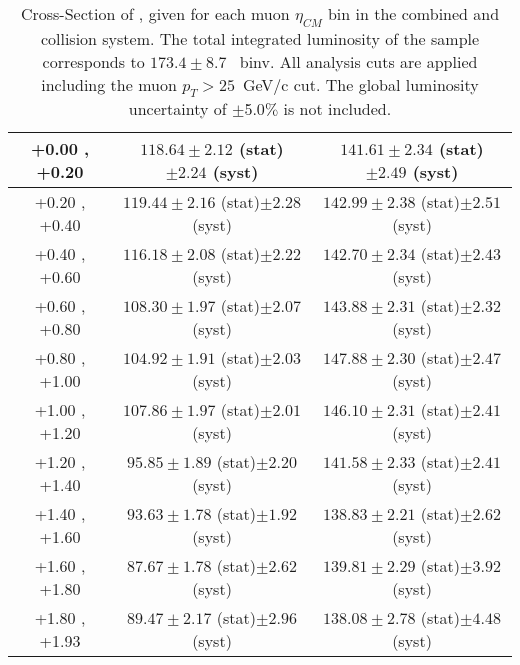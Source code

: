 \begin{table}[h!]
\begin{tabular}{|c|*2c|}
    +0.00 , +0.20 & $118.64 \pm 2.12$ (stat)$ \pm 2.24$ (syst) & $141.61 \pm 2.34$ (stat)$ \pm 2.49$ (syst)\\
    \hline
    +0.20 , +0.40 & $119.44 \pm 2.16$ (stat)$ \pm 2.28$ (syst) & $142.99 \pm 2.38$ (stat)$ \pm 2.51$ (syst)\\
    \hline
    +0.40 , +0.60 & $116.18 \pm 2.08$ (stat)$ \pm 2.22$ (syst) & $142.70 \pm 2.34$ (stat)$ \pm 2.43$ (syst)\\
    \hline
    +0.60 , +0.80 & $108.30 \pm 1.97$ (stat)$ \pm 2.07$ (syst) & $143.88 \pm 2.31$ (stat)$ \pm 2.32$ (syst)\\
    \hline
    +0.80 , +1.00 & $104.92 \pm 1.91$ (stat)$ \pm 2.03$ (syst) & $147.88 \pm 2.30$ (stat)$ \pm 2.47$ (syst)\\
    \hline
    +1.00 , +1.20 & $107.86 \pm 1.97$ (stat)$ \pm 2.01$ (syst) & $146.10 \pm 2.31$ (stat)$ \pm 2.41$ (syst)\\
    \hline
    +1.20 , +1.40 & $95.85 \pm 1.89$ (stat)$ \pm 2.20$ (syst) & $141.58 \pm 2.33$ (stat)$ \pm 2.41$ (syst)\\
    \hline
    +1.40 , +1.60 & $93.63 \pm 1.78$ (stat)$ \pm 1.92$ (syst) & $138.83 \pm 2.21$ (stat)$ \pm 2.62$ (syst)\\
    \hline
    +1.60 , +1.80 & $87.67 \pm 1.78$ (stat)$ \pm 2.62$ (syst) & $139.81 \pm 2.29$ (stat)$ \pm 3.92$ (syst)\\
    \hline
    +1.80 , +1.93 & $89.47 \pm 2.17$ (stat)$ \pm 2.96$ (syst) & $138.08 \pm 2.78$ (stat)$ \pm 4.48$ (syst)\\
    \hline
  \end{tabular}
  \caption{Cross-Section of \WToMuNu, given for each muon $\eta_{CM}$ bin in the combined \pPb and \Pbp collision system. The total integrated luminosity of the sample corresponds to $173.4 \pm 8.7$~
binv. All analysis cuts are applied including the muon $p_{T} > 25$~GeV/c cut. The global luminosity uncertainty of $\pm$5.0$\%$ is not included.}
  \label{tab:CrossSectionSyst_WToMu_PA}
\end{table}



